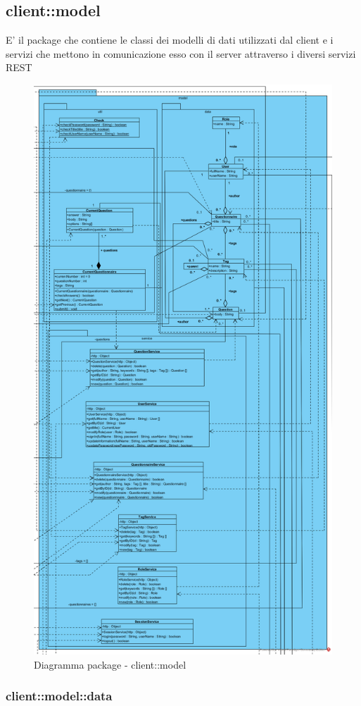 \subsection{client::model}
E' il package che contiene le classi dei modelli di dati utilizzati
dal client e i servizi che mettono in comunicazione esso con il server
attraverso i diversi servizi REST\begin{center}
		\begin{figure}[H]
			\centering \includegraphics[scale=4, max width=\textwidth, max height=\myheight]{../img/diagrammiClassi/client/model.png}
			\caption{Diagramma package - client::model}
		\end{figure}
	\end{center}\subsubsection{client::model::data}
